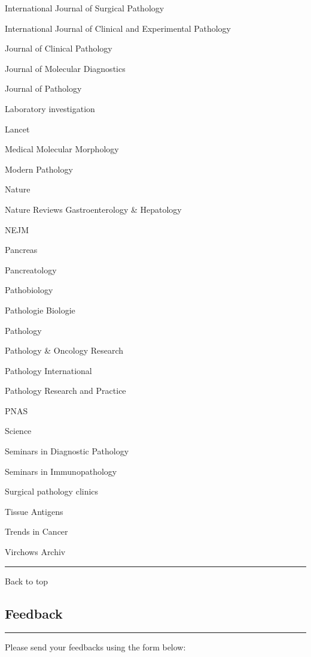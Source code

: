 \documentclass[]{article}
\begin{document}
International Journal of Surgical Pathology

International Journal of Clinical and Experimental Pathology

Journal of Clinical Pathology

Journal of Molecular Diagnostics

Journal of Pathology

Laboratory investigation

Lancet

Medical Molecular Morphology

Modern Pathology

Nature

Nature Reviews Gastroenterology \& Hepatology

NEJM

Pancreas

Pancreatology

Pathobiology

Pathologie Biologie

Pathology

Pathology \& Oncology Research

Pathology International

Pathology Research and Practice

PNAS

Science

Seminars in Diagnostic Pathology

Seminars in Immunopathology

Surgical pathology clinics

Tissue Antigens

Trends in Cancer

Virchows Archiv

\begin{center}\rule{0.5\linewidth}{\linethickness}\end{center}

Back to top

\pagebreak

\hypertarget{feedback}{%
\subsection{Feedback}\label{feedback}}

\begin{center}\rule{0.5\linewidth}{\linethickness}\end{center}

Please send your feedbacks using the form below:
\end{document}
